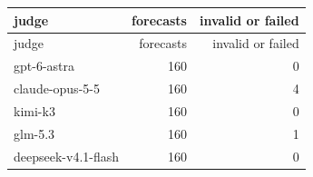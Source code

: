 \begin{longtable}{lrr}
\toprule
judge & forecasts & invalid or failed \\
\midrule
\endfirsthead
\toprule
judge & forecasts & invalid or failed \\
\midrule
\endhead
gpt-6-astra & 160 & 0 \\
claude-opus-5-5 & 160 & 4 \\
kimi-k3 & 160 & 0 \\
glm-5.3 & 160 & 1 \\
deepseek-v4.1-flash & 160 & 0 \\
\bottomrule
\end{longtable}
